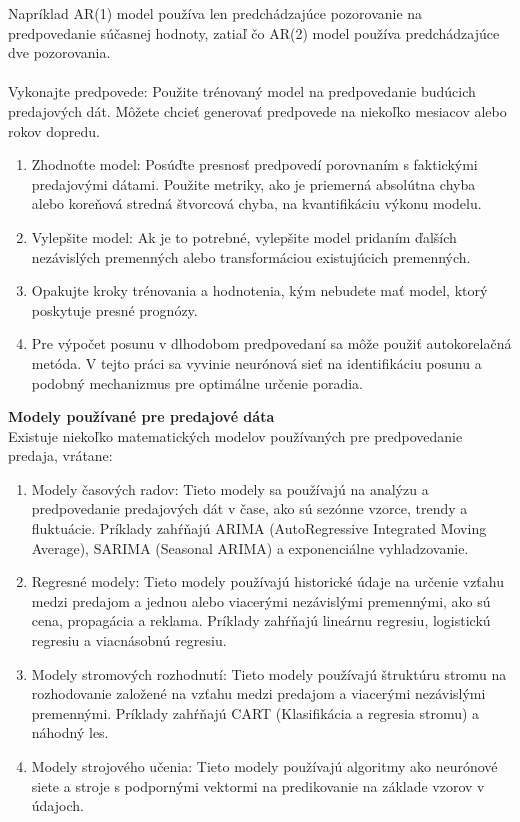     Napríklad AR(1) model používa len predchádzajúce pozorovanie na predpovedanie súčasnej hodnoty, zatiaľ čo AR(2) model používa predchádzajúce
    dve pozorovania.\\
    \\
    Vykonajte predpovede: Použite trénovaný model na predpovedanie budúcich predajových dát. Môžete chcieť generovať predpovede na niekoľko
    mesiacov alebo rokov dopredu.
    \begin{enumerate}
        \item Zhodnoťte model: Posúďte presnosť predpovedí porovnaním s faktickými predajovými dátami. Použite metriky, ako je priemerná absolútna
        chyba alebo koreňová stredná štvorcová chyba, na kvantifikáciu výkonu modelu.
        \item Vylepšite model: Ak je to potrebné, vylepšite model pridaním ďalších nezávislých premenných alebo transformáciou existujúcich premenných.
        \item Opakujte kroky trénovania a hodnotenia, kým nebudete mať model, ktorý poskytuje presné prognózy.
        \item Pre výpočet posunu v dlhodobom predpovedaní sa môže použiť autokorelačná metóda. V tejto práci sa vyvinie neurónová sieť na identifikáciu
        posunu a podobný mechanizmus pre optimálne určenie poradia.
    \end{enumerate}
    \textbf{Modely používané pre predajové dáta} \\
    Existuje niekoľko matematických modelov používaných pre predpovedanie predaja, vrátane:\\
    \begin{enumerate}
        \item Modely časových radov: Tieto modely sa používajú na analýzu a predpovedanie predajových dát v čase, ako sú sezónne vzorce,
        trendy a fluktuácie. Príklady zahŕňajú ARIMA (AutoRegressive Integrated Moving Average), SARIMA (Seasonal ARIMA) a exponenciálne vyhladzovanie.
        \item Regresné modely: Tieto modely používajú historické údaje na určenie vzťahu medzi predajom a jednou alebo viacerými
        nezávislými premennými, ako sú cena, propagácia a reklama. Príklady zahŕňajú lineárnu regresiu, logistickú regresiu a viacnásobnú regresiu.
        \item Modely stromových rozhodnutí: Tieto modely používajú štruktúru stromu na rozhodovanie založené na vzťahu medzi
        predajom a viacerými nezávislými premennými. Príklady zahŕňajú CART (Klasifikácia a regresia stromu) a náhodný les.
        \item Modely strojového učenia: Tieto modely používajú algoritmy ako neurónové siete a stroje s podpornými
        vektormi na predikovanie na základe vzorov v údajoch.
    \end{enumerate}
